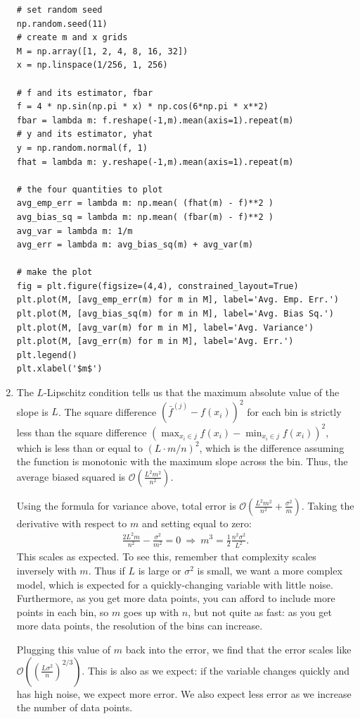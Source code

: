 \documentclass{article}
\begin{document}
\begin{enumerate}
\begin{verbatim}
# set random seed
np.random.seed(11)
# create m and x grids
M = np.array([1, 2, 4, 8, 16, 32])
x = np.linspace(1/256, 1, 256)

# f and its estimator, fbar
f = 4 * np.sin(np.pi * x) * np.cos(6*np.pi * x**2)
fbar = lambda m: f.reshape(-1,m).mean(axis=1).repeat(m)
# y and its estimator, yhat
y = np.random.normal(f, 1)
fhat = lambda m: y.reshape(-1,m).mean(axis=1).repeat(m)

# the four quantities to plot
avg_emp_err = lambda m: np.mean( (fhat(m) - f)**2 )
avg_bias_sq = lambda m: np.mean( (fbar(m) - f)**2 )
avg_var = lambda m: 1/m
avg_err = lambda m: avg_bias_sq(m) + avg_var(m)

# make the plot
fig = plt.figure(figsize=(4,4), constrained_layout=True)
plt.plot(M, [avg_emp_err(m) for m in M], label='Avg. Emp. Err.')
plt.plot(M, [avg_bias_sq(m) for m in M], label='Avg. Bias Sq.')
plt.plot(M, [avg_var(m) for m in M], label='Avg. Variance')
plt.plot(M, [avg_err(m) for m in M], label='Avg. Err.')
plt.legend()
plt.xlabel('$m$')
        \end{verbatim}
        \item 
        The $L$-Lipschitz condition tells us that the maximum absolute value of the slope is $L$.
        The square difference $(\bar{f}^{(j)} - f(x_i))^2$ for each bin is strictly less than the square difference $(\max_{x_i \in j} f(x_i) - \min_{x_i \in j} f(x_i))^2$, which is less than or equal to $(L \cdot m/n)^2$, which is the difference assuming the function is monotonic with the maximum slope across the bin.
        Thus, the average biased squared is $\mathcal{O}(\frac{L^2 m^2}{n^2})$.

        Using the formula for variance above, total error is $\mathcal{O}(\frac{L^2 m^2}{n^2} + \frac{\sigma^2}{m})$.
        Taking the derivative with respect to $m$ and setting equal to zero:
        \begin{align*}
                \frac{2L^2m}{n^2} - \frac{\sigma^2}{m^2} = 0 
                ~ \Longrightarrow ~
                m^3 = \frac{1}{2}\frac{n^2 \sigma^2}{L^2}.
        \end{align*}
        This scales as expected.
        To see this, remember that complexity scales inversely with $m$.
        Thus if $L$ is large or $\sigma^2$ is small, we want a more complex model, which is expected for a quickly-changing variable with little noise.
        Furthermore, as you get more data points, you can afford to include more points in each bin, so $m$ goes up with $n$, but not quite as fast: as you get more data points, the resolution of the bins can increase. 

        Plugging this value of $m$ back into the error, we find that the error scales like $\mathcal{O}((\frac{L\sigma^2}{n})^{2/3})$.
        This is also as we expect: if the variable changes quickly and has high noise, we expect more error.
        We also expect less error as we increase the number of data points.
\end{enumerate}
\end{document}
